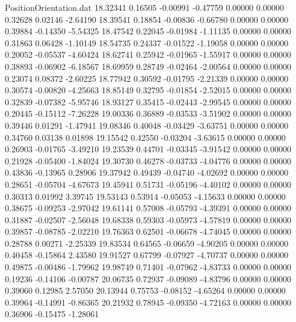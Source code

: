 \begin{filecontents}{PositionOrientation.dat}
  18.32341    0.16505   -0.00991    -0.47759    0.00000    0.00000    0.32628    0.02146   -2.64190
  18.39541    0.18854   -0.00836    -0.66780    0.00000    0.00000    0.39884   -0.14350   -5.54325
  18.47542    0.22045   -0.01984    -1.11135    0.00000    0.00000    0.31863    0.06428   -1.10149
  18.54735    0.24337   -0.01522    -1.19058    0.00000    0.00000    0.20052   -0.05537   -4.60424
  18.62741    0.25942   -0.01965    -1.55917    0.00000    0.00000    0.38893   -0.06902   -6.18567
  18.69959    0.28749   -0.02464    -2.00564    0.00000    0.00000    0.23074    0.08372   -2.60225
  18.77942    0.30592   -0.01795    -2.21339    0.00000    0.00000    0.30574   -0.00820   -4.25663
  18.85149    0.32795   -0.01854    -2.52015    0.00000    0.00000    0.32839   -0.07382   -5.95746
  18.93127    0.35415   -0.02443    -2.99545    0.00000    0.00000    0.20445   -0.15112   -7.26228
  19.00336    0.36889   -0.03533    -3.51902    0.00000    0.00000    0.39446    0.01291   -1.47941
  19.08346    0.40048   -0.03429    -3.63751    0.00000    0.00000    0.34760    0.03138    0.01898
  19.15542    0.42550   -0.03204    -3.63615    0.00000    0.00000    0.26903   -0.01765   -3.49210
  19.23539    0.44701   -0.03345    -3.91542    0.00000    0.00000    0.21928   -0.05400   -1.84024
  19.30730    0.46278   -0.03733    -4.04776    0.00000    0.00000    0.43836   -0.13965    0.28906
  19.37942    0.49439   -0.04740    -4.02692    0.00000    0.00000    0.28651   -0.05704   -4.67673
  19.45941    0.51731   -0.05196    -4.40102    0.00000    0.00000    0.30313    0.01992    3.39745
  19.53143    0.53914   -0.05053    -4.15633    0.00000    0.00000    0.38675   -0.09253   -2.97042
  19.61141    0.57008   -0.05793    -4.39391    0.00000    0.00000    0.31887   -0.02507   -2.56048
  19.68338    0.59303   -0.05973    -4.57819    0.00000    0.00000    0.39857   -0.08785   -2.02210
  19.76363    0.62501   -0.06678    -4.74045    0.00000    0.00000    0.28788    0.00271   -2.25339
  19.83534    0.64565   -0.06659    -4.90205    0.00000    0.00000    0.40458   -0.15864    2.43580
  19.91527    0.67799   -0.07927    -4.70737    0.00000    0.00000    0.49875   -0.00486   -1.79962
  19.98749    0.71401   -0.07962    -4.83733    0.00000    0.00000    0.19236   -0.14106   -0.00787
  20.06735    0.72937   -0.09089    -4.83796    0.00000    0.00000    0.39060    0.12985    2.57050
  20.13944    0.75753   -0.08152    -4.65264    0.00000    0.00000    0.39964   -0.14991   -0.86365
  20.21932    0.78945   -0.09350    -4.72163    0.00000    0.00000    0.36906   -0.15475   -1.28061

\end{filecontents}
